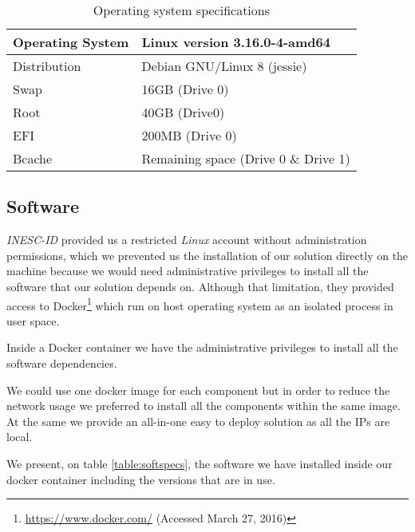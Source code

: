 	\begin{table}[!htb]
\centering
\caption{Operating system specifications}
\label{table:osspecs}
\begin{tabular}{|l|l|}
\hline
Operating System & Linux version 3.16.0-4-amd64 \\ \hline
Distribution & Debian GNU/Linux 8 (jessie)\footnotemark \\ \hline
Swap & 16GB (Drive 0)\\ \hline
Root & 40GB (Drive0)\\ \hline
EFI & 200MB (Drive 0)\\ \hline
Bcache & Remaining space (Drive 0 \& Drive 1) \\ \hline
\end{tabular}
\end{table}


\subsection{Software}
	\emph{INESC-ID} provided us a restricted \emph{Linux} account without administration permissions, which we prevented us the installation of our solution directly on the machine because we would need administrative privileges to install all the software that our solution depends on. Although that limitation, they provided access to Docker\footnote{\url{https://www.docker.com/} (Accessed March 27, 2016)} which run on host operating system as an isolated process in user space.

	Inside a Docker container we have the administrative privileges to install all the software dependencies.

	We could use one docker image for each component but in order to reduce the network usage we preferred to install all the components within the same image. At the same we provide an all-in-one easy to deploy solution as all the \ac{IP}s are local.

	We present, on table \ref{table:softspecs}, the software we have installed inside our docker container including the versions that are in use.

